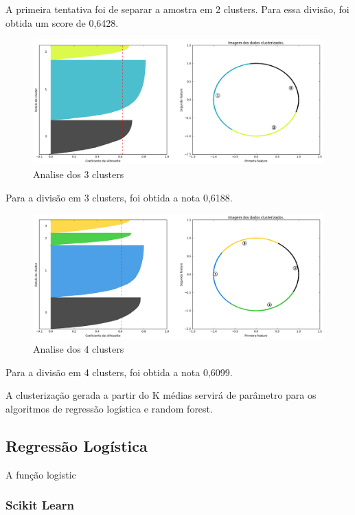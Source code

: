 A primeira tentativa foi de separar a amostra em 2 clusters. Para essa divisão, foi obtida um score de 0,6428.
\lipsum[20]

\begin{figure}[ht]
\caption{Analise dos 3 clusters }
\centerline{\includegraphics[width=.85\textwidth]{img/silhoute3}}
\end{figure}

Para a divisão em 3 clusters, foi obtida a nota 0,6188.
\lipsum[32]

\begin{figure}[ht]
\caption{Analise dos 4 clusters }
\centerline{\includegraphics[width=.85\textwidth]{img/silhoute4}}
\end{figure}

Para a divisão em 4 clusters, foi obtida a nota 0,6099.
\lipsum[31]

A clusterização gerada a partir do K médias servirá de parâmetro para os algoritmos de regressão logística e random forest.


\subsection{Regressão Logística}

A função logistic


\subsubsection{Scikit Learn}


